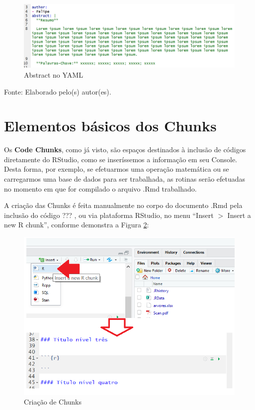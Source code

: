 \documentclass[12pt,brazil,]{book}
\begin{document}
\begin{figure}

{\centering \includegraphics[width=0.6\linewidth]{abstract} 

}

\caption{Abstract no YAML}\label{fig:abstract}
\end{figure}

Fonte: Elaborado pelo(s) autor(es).

\hypertarget{elementos-basicos-dos-chunks}{%
\section{Elementos básicos dos
Chunks}\label{elementos-basicos-dos-chunks}}

Os \textbf{Code Chunks}, como já visto, são espaços destinados à
inclusão de códigos diretamente do RStudio, como se inseríssemos a
informação em seu Console. Desta forma, por exemplo, se efetuarmos uma
operação matemática ou se carregarmos uma base de dados para ser
trabalhada, as rotinas serão efetuadas no momento em que for compilado o
arquivo .Rmd trabalhado.

A criação das Chunks é feita manualmente no corpo do documento .Rmd pela
inclusão do código ??? , ou via plataforma RStudio, no menu ``Insert
\(>\) Insert a new R chunk'', conforme demonstra a Figura
\ref{fig:rmarkchunk1}:

\begin{figure}

{\centering \includegraphics[width=0.6\linewidth]{rmarkchunk1} 

}

\caption{Criação de Chunks}\label{fig:rmarkchunk1}
\end{figure}
\end{document}
